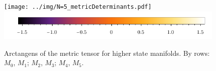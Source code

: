 \begin{figure}[H]
    \centering
    \texttt{[image: ../img/N=5\_metricDeterminants.pdf]}
    \includegraphics[scale=1.2]{../img/N=3_barA.pdf}
    \caption{Arctangens of the metric tensor for higher state manifolds. By  rows: $M_0$, $M_1$; $M_2$, $M_3$; $M_4$, $M_5$.}
    \label{fig:higherStateManifolds}    
\end{figure}


